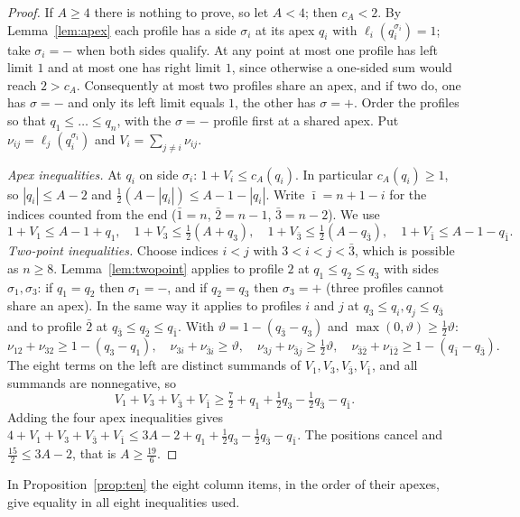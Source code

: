 \documentclass[11pt]{amsart}
\begin{document}
\begin{proof}
If $A\ge4$ there is nothing to prove, so let $A<4$; then $c_A<2$. By Lemma~\ref{lem:apex} each profile has a side
$\sigma_i$ at its apex $q_i$ with $\ell_i(q_i^{\sigma_i})=1$; take $\sigma_i=-$ when both sides qualify. At any
point at most one profile has left limit $1$ and at most one has right limit $1$, since otherwise a one-sided sum
would reach $2>c_A$. Consequently at most two profiles share an apex, and if two do, one has $\sigma=-$ and only
its left limit equals $1$, the other has $\sigma=+$. Order the profiles so that $q_1\le\dots\le q_n$, with the
$\sigma=-$ profile first at a shared apex. Put $\nu_{ij}=\ell_j(q_i^{\sigma_i})$ and $V_i=\sum_{j\ne i}\nu_{ij}$.

\emph{Apex inequalities.} At $q_i$ on side $\sigma_i$: $1+V_i\le c_A(q_i)$. In particular $c_A(q_i)\ge1$, so
$|q_i|\le A-2$ and $\frac12(A-|q_i|)\le A-1-|q_i|$. Write $\bar\imath=n+1-i$ for the indices counted from the end
($\bar1=n$, $\bar2=n-1$, $\bar3=n-2$). We use
\[
1+V_1\le A-1+q_1,\quad 1+V_3\le\tfrac12(A+q_3),\quad 1+V_{\bar3}\le\tfrac12(A-q_{\bar3}),\quad 1+V_{\bar1}\le A-1-q_{\bar1} .
\]
\emph{Two-point inequalities.} Choose indices $i<j$ with $3<i<j<\bar3$, which is possible as $n\ge8$.
Lemma~\ref{lem:twopoint} applies to profile $2$ at $q_1\le q_2\le q_3$ with sides $\sigma_1,\sigma_3$: if
$q_1=q_2$ then $\sigma_1=-$, and if $q_2=q_3$ then $\sigma_3=+$ (three profiles cannot share an apex). In the same
way it applies to profiles $i$ and $j$ at $q_3\le q_i,q_j\le q_{\bar3}$ and to profile $\bar2$ at
$q_{\bar3}\le q_{\bar2}\le q_{\bar1}$. With $\vartheta=1-(q_{\bar3}-q_3)$ and $\max(0,\vartheta)\ge\frac12\vartheta$:
\[
\nu_{12}+\nu_{32}\ge1-(q_3-q_1),\quad \nu_{3i}+\nu_{\bar3i}\ge\vartheta,\quad
\nu_{3j}+\nu_{\bar3j}\ge\tfrac12\vartheta,\quad \nu_{\bar3\bar2}+\nu_{\bar1\bar2}\ge1-(q_{\bar1}-q_{\bar3}).
\]
The eight terms on the left are distinct summands of $V_1,V_3,V_{\bar3},V_{\bar1}$, and all summands are
nonnegative, so
\[
V_1+V_3+V_{\bar3}+V_{\bar1}\ge\tfrac72+q_1+\tfrac12q_3-\tfrac12q_{\bar3}-q_{\bar1}.
\]
Adding the four apex inequalities gives $4+V_1+V_3+V_{\bar3}+V_{\bar1}\le3A-2+q_1+\frac12q_3-\frac12q_{\bar3}-q_{\bar1}$.
The positions cancel and $\frac{15}2\le3A-2$, that is $A\ge\frac{19}6$.
\end{proof}

In Proposition~\ref{prop:ten} the eight column items, in the order of their apexes, give equality in all eight
inequalities used.

\end{document}
